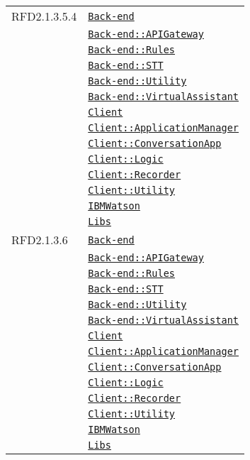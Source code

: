 \begin{longtable}{|>{\centering}m{3cm}|m{10cm}<{\centering}|}
RFD2.1.3.5.4 & \hyperref[Back-end]{\texttt{Back-end}}\\
& \hyperref[Back-end::APIGateway]{\texttt{Back-end::APIGateway}}\\
& \hyperref[Back-end::Rules]{\texttt{Back-end::Rules}}\\
& \hyperref[Back-end::STT]{\texttt{Back-end::STT}}\\
& \hyperref[Back-end::Utility]{\texttt{Back-end::Utility}}\\
& \hyperref[Back-end::VirtualAssistant]{\texttt{Back-end::VirtualAssistant}}\\
& \hyperref[Client]{\texttt{Client}}\\
& \hyperref[Client::ApplicationManager]{\texttt{Client::ApplicationManager}}\\
& \hyperref[Client::ConversationApp]{\texttt{Client::ConversationApp}}\\
& \hyperref[Client::Logic]{\texttt{Client::Logic}}\\
& \hyperref[Client::Recorder]{\texttt{Client::Recorder}}\\
& \hyperref[Client::Utility]{\texttt{Client::Utility}}\\
& \hyperref[IBMWatson]{\texttt{IBMWatson}}\\
& \hyperref[Libs]{\texttt{Libs}}\\ \hline

RFD2.1.3.6 & \hyperref[Back-end]{\texttt{Back-end}}\\
& \hyperref[Back-end::APIGateway]{\texttt{Back-end::APIGateway}}\\
& \hyperref[Back-end::Rules]{\texttt{Back-end::Rules}}\\
& \hyperref[Back-end::STT]{\texttt{Back-end::STT}}\\
& \hyperref[Back-end::Utility]{\texttt{Back-end::Utility}}\\
& \hyperref[Back-end::VirtualAssistant]{\texttt{Back-end::VirtualAssistant}}\\
& \hyperref[Client]{\texttt{Client}}\\
& \hyperref[Client::ApplicationManager]{\texttt{Client::ApplicationManager}}\\
& \hyperref[Client::ConversationApp]{\texttt{Client::ConversationApp}}\\
& \hyperref[Client::Logic]{\texttt{Client::Logic}}\\
& \hyperref[Client::Recorder]{\texttt{Client::Recorder}}\\
& \hyperref[Client::Utility]{\texttt{Client::Utility}}\\
& \hyperref[IBMWatson]{\texttt{IBMWatson}}\\
& \hyperref[Libs]{\texttt{Libs}}\\ \hline


\end{longtable}
